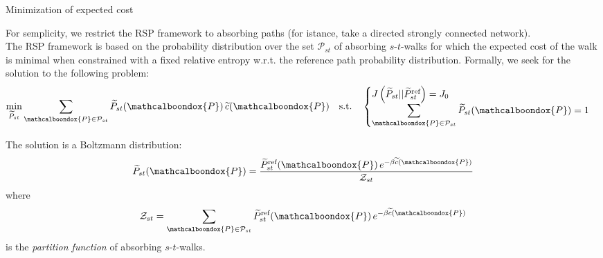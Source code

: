 \documentclass[13pt]{beamer}
\newcommand{\bondox}{\mathcalboondox}
\begin{document}
    \begin{frame}[t,allowframebreaks]{Minimization of expected cost}

    For semplicity, we restrict the RSP framework to absorbing paths (for istance, take a directed strongly connected network).\\
    \vspace{0.8em}
    The RSP framework is based on the probability distribution over the set $\mathcal{P}_{st}$ of absorbing $s$-$t$-walks for which the expected cost of the walk is minimal when constrained with a fixed relative entropy w.r.t. the reference path probability distribution. Formally, we seek for the solution to the following problem:
    \begin{equation*}
    \min_{\widetilde{P}_{st}}\sum_{\bondox{P}\in \mathcal{P}_{st}}\widetilde{P}_{st}(\bondox{P})\,\widetilde{c}(\bondox{P})\quad\text{s.t.}\quad \begin{cases}
    J\left(\widetilde{P}_{st}||\widetilde{P}_{st}^{\text{ref}}\right)=J_0 \\
    \displaystyle \sum_{\bondox{P}\in \mathcal{P}_{st}} \widetilde{P}_{st}(\bondox{P}) = 1
    \end{cases}
    \end{equation*}


    The solution is a Boltzmann distribution:
    \begin{equation*}
    \widetilde{P}_{st}(\bondox{P})=\frac{\widetilde{P}_{st}^{\text{ref}}(\bondox{P})\,e^{-\beta\widetilde{c}(\bondox{P})}}{\mathcal{Z}_{st}} 
    \end{equation*}
    where
    \begin{equation*}
    \mathcal{Z}_{st}=\sum_{\bondox{P}\in \mathcal{P}_{st}}\widetilde{P}_{st}^{\text{ref}}(\bondox{P})\,e^{-\beta\widetilde{c}(\bondox{P})}
    \end{equation*}
    is the \emph{partition function} of absorbing $s$-$t$-walks. %
    \end{frame}
\end{document}
